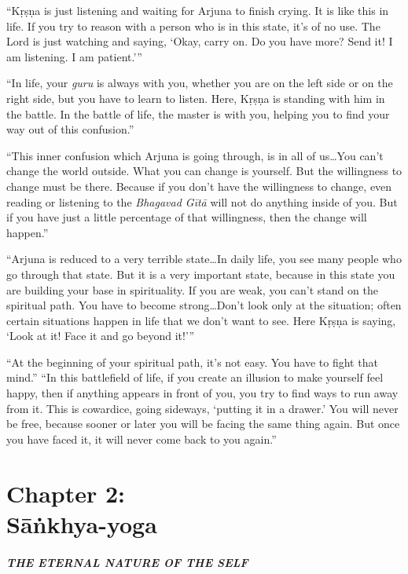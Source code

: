 \documentclass[12pt, twoside, openright]{memoir}
\begin{document}
\enquote{Kṛṣṇa is just listening and waiting for Arjuna to finish crying. It is like this in life. If you try to reason with a person who is in this state, it’s of no use. The Lord is just watching and saying, \enquote{Okay, carry on. Do you have more? Send it! I am listening. I am patient.}}

\enquote{In life, your \textit{guru} is always with you, whether you are on the left side or on the right side, but you have to learn to listen. Here, Kṛṣṇa is standing with him in the battle. In the battle of life, the master is with you, helping you to find your way out of this confusion.}

\enquote{This inner confusion which Arjuna is going through, is in all of us\ldots You can’t change the world outside. What you can change is yourself. But the willingness to change must be there. Because if you don’t have the willingness to change, even reading or listening to the \textit{Bhagavad Gītā} will not do anything inside of you. But if you have just a little percentage of that willingness, then the change will happen.}

\enquote{Arjuna is reduced to a very terrible state\ldots In daily life, you see many people who go through that state. But it is a very important state, because in this state you are building your base in spirituality. If you are weak, you can’t stand on the spiritual path. You have to become strong\ldots Don’t look only at the situation; often certain situations happen in life that we don’t want to see. Here Kṛṣṇa is saying, \enquote{Look at it! Face it and go beyond it!}}

\enquote{At the beginning of your spiritual path, it’s not easy. You have to fight that mind.}
\enquote{In this battlefield of life, if you create an illusion to make yourself feel happy, then if anything appears in front of you, you try to find ways to run away from it. This is cowardice, going sideways, \enquote{putting it in a drawer.} You will never be free, because sooner or later you will be facing the same thing again. But once you have faced it, it will never come back to you again.}
 \chapter{Chapter 2: \\Sāṅkhya-yoga}\label{chap-sankhya-yoga}

\paragraph*{\MakeUppercase{The Eternal Nature of the Self}}
\end{document}
